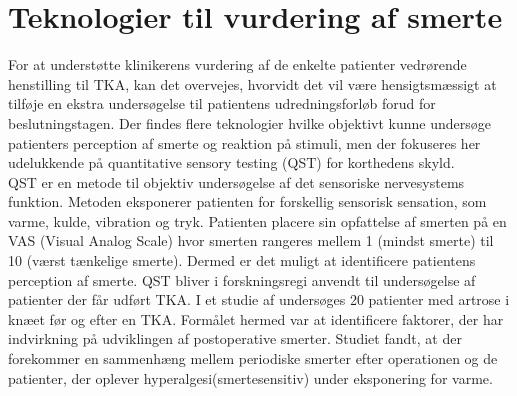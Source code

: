 \section{Teknologier til vurdering af smerte}
For at understøtte klinikerens vurdering af de enkelte patienter vedrørende henstilling til TKA, kan det overvejes, hvorvidt det vil være hensigtsmæssigt at tilføje en ekstra undersøgelse til patientens udredningsforløb forud for beslutningstagen. %
Der findes flere teknologier hvilke objektivt kunne undersøge patienters perception af smerte og reaktion på stimuli, men der fokuseres her udelukkende på quantitative sensory testing (QST) for korthedens skyld. \\
QST er en metode til objektiv undersøgelse af det sensoriske nervesystems funktion. %
Metoden eksponerer patienten for forskellig sensorisk sensation, som varme, kulde, vibration og tryk. Patienten placere sin opfattelse af smerten på en VAS (Visual Analog Scale) hvor smerten rangeres mellem 1 (mindst smerte) til 10 (værst tænkelige smerte). Dermed er det muligt at identificere patientens perception af smerte.
QST bliver i forskningsregi anvendt til undersøgelse af patienter der får udført TKA. I et studie af  undersøges 20 patienter med artrose i knæet før og efter en TKA. Formålet hermed var at identificere faktorer, der har indvirkning på udviklingen af postoperative smerter. 
Studiet fandt, at der forekommer en sammenhæng mellem periodiske smerter efter operationen og de patienter, der oplever hyperalgesi(smertesensitiv) under eksponering for varme. \citep{Martinez2007} 


